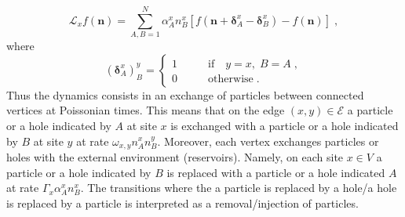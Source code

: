 \documentclass[10pt]{article}
\numberwithin{equation}{section}
\numberwithin{equation}{subsection}
\newcommand{\co}{\;,}
\newcommand{\dt}{\;.}
\begin{document}
\begin{equation}\label{siteGenerator}
    \mathcal{L}_{x}f(\bm{n})=\sum_{A,B=1}^{N}\alpha_{A}^{x}n_{B}^{x}\left[f(\bm{n}+\bm{\delta}_{A}^{x}-\bm{\delta}_{B}^{x})-f(\bm{n})\right]\co
\end{equation}
where 
\begin{equation}
(\bm{\delta}_{A}^{x})^{y}_{B}=\begin{cases}
1\qquad &\text{if}\quad y=x,\;B=A\;,\\
0\qquad &\text{otherwise}\dt
\end{cases}
\end{equation}
Thus the dynamics consists in an exchange of particles between connected vertices at Poissonian times. 
This means that on the edge $(x,y)\in \mathcal{E}$  a particle {or a hole} indicated by $A$ at site $x$ is exchanged with a particle {or a hole} indicated by $B$ at site $y$ at rate $\omega_{x,y}n_{A}^{x}n_{B}^{y}$.
Moreover, each vertex  exchanges particles {or holes} with the external environment (reservoirs). 
Namely, on each site $x\in V$  a particle {or a hole} indicated by $B$ is replaced with a particle {or a hole} indicated $A$ at rate $\Gamma_{x}\alpha_{A}^{x}n_{B}^{x}$. {The transitions where the a particle is replaced by a hole/a hole is replaced by a particle is interpreted as a removal/injection of particles.}
%
\end{document}
